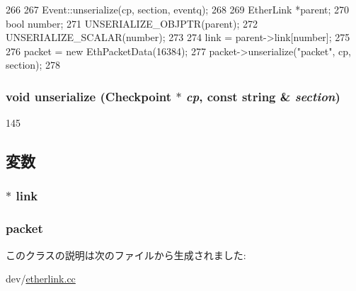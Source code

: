 \begin{DoxyCode}
266 {
267     Event::unserialize(cp, section, eventq);
268 
269     EtherLink *parent;
270     bool number;
271     UNSERIALIZE_OBJPTR(parent);
272     UNSERIALIZE_SCALAR(number);
273 
274     link = parent->link[number];
275 
276     packet = new EthPacketData(16384);
277     packet->unserialize("packet", cp, section);
278 }
\end{DoxyCode}
\hypertarget{classLinkDelayEvent_a7aaf1d4989130c720a8eb3af7e6068de}{
\subsubsection[{unserialize}]{\setlength{\rightskip}{0pt plus 5cm}void unserialize ({\bf Checkpoint} $\ast$ {\em cp}, \/  const string \& {\em section})}}
\label{classLinkDelayEvent_a7aaf1d4989130c720a8eb3af7e6068de}



\begin{DoxyCode}
145 {}
\end{DoxyCode}


\subsection{変数}
\hypertarget{classLinkDelayEvent_ad5879df04b868c303ab79e3098fe1627}{
\subsubsection[{link}]{$\ast$ {\bf link}}}
\label{classLinkDelayEvent_ad5879df04b868c303ab79e3098fe1627}
\hypertarget{classLinkDelayEvent_a8bd0d3f7eb9e8d7189c7027028a5fac0}{
\subsubsection[{packet}]{ {\bf packet}}}
\label{classLinkDelayEvent_a8bd0d3f7eb9e8d7189c7027028a5fac0}


このクラスの説明は次のファイルから生成されました:\begin{DoxyCompactItemize}
\item 
dev/\hyperlink{etherlink_8cc}{etherlink.cc}\end{DoxyCompactItemize}
